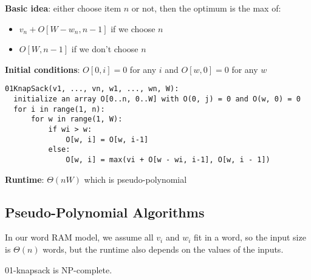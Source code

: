 \documentclass[11pt]{article}
\begin{document}
\textbf{Basic idea}: either choose item \(n\) or not, then the optimum is the max of:
\begin{itemize}
\item \(v_{n} + O[W - w_{n}, n - 1]\) if we choose \(n\)
\item \(O[W, n-1]\) if we don't choose \(n\)
\end{itemize}

\textbf{Initial conditions}: \(O[0, i] = 0\) for any \(i\) and \(O[w, 0] = 0\) for any \(w\)

\begin{verbatim}
01KnapSack(v1, ..., vn, w1, ..., wn, W):
  initialize an array O[0..n, 0..W] with O(0, j) = 0 and O(w, 0) = 0
  for i in range(1, n):
      for w in range(1, W):
          if wi > w:
              O[w, i] = O[w, i-1]
          else:
              O[w, i] = max(vi + O[w - wi, i-1], O[w, i - 1])
\end{verbatim}
\textbf{Runtime}: \(\Theta(nW)\) which is pseudo-polynomial
\subsection{Pseudo-Polynomial Algorithms}
\label{sec:org7b0f5a1}
In our word RAM model, we assume all \(v_{i}\) and \(w_{i}\) fit in a word,
so the input size is \(\Theta(n)\) words, but the runtime also depends on the values of the inputs.

01-knapsack is NP-complete.
\end{document}
